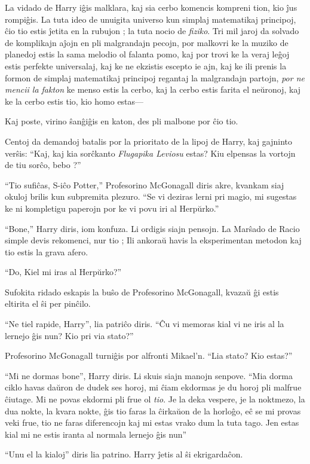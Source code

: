 La vidado de Harry iĝis malklara, kaj sia cerbo komencis kompreni
tion, kio ĵus rompiĝis. La tuta ideo de unuigita universo kun
simplaj matematikaj principoj, ĉio tio estis ĵetita en la
rubujon ; la tuta nocio de \emph{fiziko}. Tri mil jaroj da solvado de
komplikajn aĵojn en pli malgrandajn pecojn, por malkovri ke la muziko
de planedoj estis la sama melodio ol falanta pomo, kaj por trovi ke la
veraj leĝoj estis perfekte universalaj, kaj ke ne ekzistis escepto ie
ajn, kaj ke ili prenis la formon de simplaj matematikaj principoj
regantaj la malgrandajn partojn, \emph{por ne mencii la fakton} ke
menso estis la cerbo, kaj la cerbo estis farita el neŭronoj, kaj ke la
cerbo estis tio, kio homo estas—

Kaj poste, virino ŝanĝiĝis en katon, des pli malbone por ĉio tio.

Centoj da demandoj batalis por la prioritato de la lipoj de Harry, kaj
gajninto verŝis: ``Kaj, kaj kia sorĉkanto \emph{Flugapika Leviosu}
estas? Kiu elpensas la vortojn de tiu sorĉo, bebo ?''

``Tio sufiĉas, S-iĉo Potter,'' Profesorino McGonagall diris akre, kvankam
siaj okuloj brilis kun subpremita plezuro. ``Se vi deziras lerni pri
magio, mi sugestas ke ni kompletigu paperojn por ke vi povu iri al
Herpŭrko.''

``Bone,'' Harry diris, iom konfuza. Li ordigis siajn pensojn. La
Marŝado de Racio simple devis rekomenci, nur tio ; Ili ankoraŭ havis
la eksperimentan metodon kaj tio estis la grava afero.

``Do, Kiel mi iras al Herpŭrko?''

Sufokita ridado eskapis la buŝo de Profesorino McGonagall, kvazaŭ ĝi estis
eltirita el ŝi per pinĉilo.

``Ne tiel rapide, Harry'', lia patriĉo diris. ``Ĉu vi memoras kial vi ne
iris al la lernejo ĝis nun? Kio pri via stato?''

Profesorino McGonagall turniĝis por alfronti Mikael'n. ``Lia stato? Kio estas?''

``Mi ne dormas bone'', Harry diris. Li skuis siajn manojn
senpove. ``Mia dorma ciklo havas daŭron de dudek ses horoj, mi ĉiam
ekdormas je du horoj pli malfrue ĉiutage. Mi ne povas ekdormi pli frue
ol \emph{tio}. Je la deka vespere, je la noktmezo, la dua nokte, la
kvara nokte, ĝis tio faras la ĉirkaŭon de la horloĝo, eĉ se mi provas
veki frue, tio ne faras diferencojn kaj mi estas vrako dum la tuta
tago. Jen estas kial mi ne estis iranta al normala lernejo ĝis nun''

``Unu el la kialoj'' diris lia patrino. Harry ĵetis al ŝi ekrigardaĉon.

